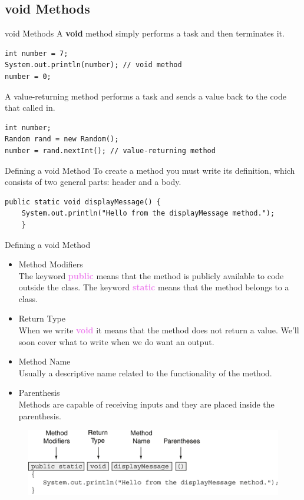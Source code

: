 \documentclass[11pt]{beamer}
\newcommand{\violet}[1]{\textcolor{violet}{#1}}
\begin{document}
\subsection{void Methods}
\begin{frame}[fragile]{void Methods}
    A \textbf{void} method simply performs a task and then terminates it.
    \begin{lstlisting}
int number = 7;
System.out.println(number); // void method
number = 0;
    \end{lstlisting}
    A value-returning method performs a task and sends a value back to the code that called in.
    \begin{lstlisting}
int number;
Random rand = new Random();
number = rand.nextInt(); // value-returning method
    \end{lstlisting}
\end{frame}

\begin{frame}[fragile]{Defining a void Method}
    To create a method you must write its definition, which consists of two general parts: header and a body.
    \begin{lstlisting}
public static void displayMessage() {
    System.out.println("Hello from the displayMessage method.");
    }
    \end{lstlisting}
\end{frame}

\begin{frame}{Defining a void Method}
\footnotesize
\begin{itemize}
    \item Method Modifiers \\
    The keyword \violet{\textbf{public}} means that the method is publicly available to code outside the class. The keyword \violet{\textbf{static}} means that the method belongs to a class.
    \item Return Type \\ 
    When we write \violet{\textbf{void}} it means that the method does not return a value. We'll soon cover what to write when we do want an output.
    \item Method Name \\ 
    Usually a descriptive name related to the functionality of the method.
    \item Parenthesis \\ 
    Methods are capable of receiving inputs and they are placed inside the parenthesis.
\end{itemize}
    \noindent 
    \begin{figure}[H]
    \centering
    \includegraphics[scale=0.9]{Images/chapter05_methodDescription.png}
    \end{figure}    
\end{frame}
\end{document}

